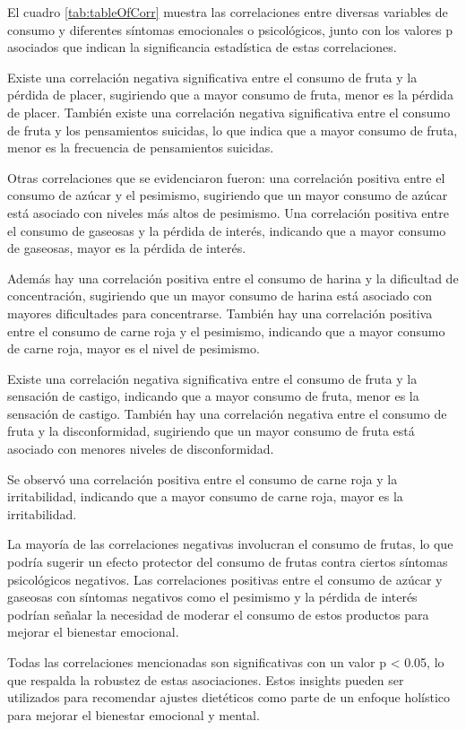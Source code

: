 \documentclass[jou]{apa7}
\begin{document}
	El cuadro \ref{tab:tableOfCorr} muestra las correlaciones entre diversas variables de consumo y
	diferentes síntomas emocionales o psicológicos, junto con los valores p
	asociados que indican la significancia estadística de estas
	correlaciones.

	Existe una correlación negativa significativa entre el consumo de fruta
	y la pérdida de placer, sugiriendo que a mayor consumo de fruta, menor
	es la pérdida de placer. También existe una correlación negativa
	significativa entre el consumo de fruta y los pensamientos suicidas, lo
	que indica que a mayor consumo de fruta, menor es la frecuencia de
	pensamientos suicidas.

	Otras correlaciones que se evidenciaron fueron: una correlación positiva
	entre el consumo de azúcar y el pesimismo, sugiriendo que un mayor
	consumo de azúcar está asociado con niveles más altos de pesimismo. Una
	correlación positiva entre el consumo de gaseosas y la pérdida de
	interés, indicando que a mayor consumo de gaseosas, mayor es la pérdida
	de interés.

	Además hay una correlación positiva entre el consumo de harina y la
	dificultad de concentración, sugiriendo que un mayor consumo de harina
	está asociado con mayores dificultades para concentrarse. También hay
	una correlación positiva entre el consumo de carne roja y el pesimismo,
	indicando que a mayor consumo de carne roja, mayor es el nivel de
	pesimismo.

	Existe una correlación negativa significativa entre el consumo de fruta
	y la sensación de castigo, indicando que a mayor consumo de fruta, menor
	es la sensación de castigo. También hay una correlación negativa entre
	el consumo de fruta y la disconformidad, sugiriendo que un mayor consumo
	de fruta está asociado con menores niveles de disconformidad.

	Se observó una correlación positiva entre el consumo de carne roja y la
	irritabilidad, indicando que a mayor consumo de carne roja, mayor es la
	irritabilidad.

	La mayoría de las correlaciones negativas involucran el consumo de
	frutas, lo que podría sugerir un efecto protector del consumo de frutas
	contra ciertos síntomas psicológicos negativos. Las correlaciones
	positivas entre el consumo de azúcar y gaseosas con síntomas negativos
	como el pesimismo y la pérdida de interés podrían señalar la necesidad
	de moderar el consumo de estos productos para mejorar el bienestar
	emocional.

	Todas las correlaciones mencionadas son significativas con un valor p
	\textless{} 0.05, lo que respalda la robustez de estas asociaciones.
	Estos insights pueden ser utilizados para recomendar ajustes dietéticos
	como parte de un enfoque holístico para mejorar el bienestar emocional y
	mental.
\end{document}
